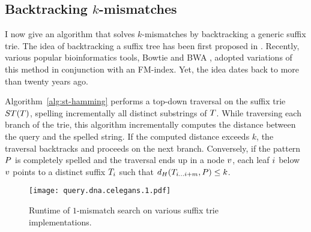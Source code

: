 %

\subsection{Backtracking $k$-mismatches}
\label{sec:index:algo:kmismatches}

I now give an algorithm that solves $k$-mismatches by backtracking a generic suffix trie.
The idea of backtracking a suffix tree has been first proposed in \citep{Ukkonen1993}.
Recently, various popular bioinformatics tools, \eg Bowtie \citep{Langmead2009} and BWA \citep{Li2009}, adopted variations of this method in conjunction with an FM-index.
Yet, the idea dates back to more than twenty years ago.

Algorithm~\ref{alg:st-hamming} performs a top-down traversal on the suffix trie $ST(T)$, spelling incrementally all distinct substrings of $T$.
While traversing each branch of the trie, this algorithm incrementally computes the distance between the query and the spelled string.
If the computed distance exceeds $k$, the traversal backtracks and proceeds on the next branch.
Conversely, if the pattern $P$ is completely spelled and the traversal ends up in a node $v$, each leaf $i$ below $v$ points to a distinct suffix ${T}_{i}$ such that $d_H({T}_{{i}\dots{i+m}}, P) \leq k$.

\begin{figure}[b]
\begin{center}
\caption[$k$-mismatches runtime]{Runtime of $1$-mismatch search on various suffix trie implementations.}
\label{fig:query-dna-apx}
\texttt{[image: query.dna.celegans.1.pdf]}
\end{center}
\end{figure}

